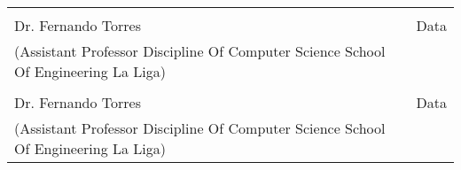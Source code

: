 \documentclass[a4paper, 12pt]{article}
\begin{document}
\vspace{2cm}
\noindent\begin{tabular}{@{}>{\centering}p{2.5in}>{\centering}p{2.5in}@{}}
	\dotfill                         & \dotfill \tabularnewline
	Dr. Fernando Torres              &  Data \tabularnewline
	(Assistant Professor Discipline Of Computer Science School Of Engineering La Liga)  
									 &  \tabularnewline
									 \dotfill                         & \dotfill \tabularnewline
	Dr. Fernando Torres              &  Data \tabularnewline
	(Assistant Professor Discipline Of Computer Science School Of Engineering La Liga)  
									 &  \tabularnewline
	\end{tabular} 






\end{document}
